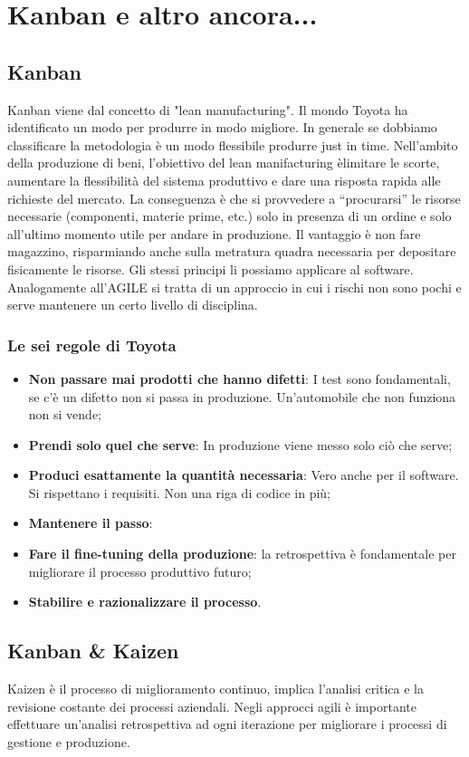 \section{Kanban e altro ancora...}
\subsection{Kanban}
Kanban viene dal concetto di "lean manufacturing". Il mondo Toyota ha identificato un modo per produrre in modo migliore. In generale se dobbiamo classificare la metodologia è un modo flessibile produrre just in time. Nell’ambito della produzione di beni, l’obiettivo del lean manifacturing èlimitare le scorte, aumentare la flessibilità del sistema produttivo e dare una risposta rapida alle richieste del mercato. La conseguenza è che si provvedere a “procurarsi” le risorse necessarie (componenti, materie prime, etc.) solo in presenza di un ordine e solo all’ultimo momento utile per andare in produzione.
Il vantaggio è non fare magazzino, risparmiando anche sulla metratura quadra necessaria per depositare fisicamente le risorse. Gli stessi principi li possiamo applicare al software.
Analogamente all'AGILE si tratta di un approccio in cui i rischi non sono pochi e serve mantenere un certo livello di disciplina.

\subsubsection{Le sei regole di Toyota}
\begin{itemize}
	\item \textbf{Non passare mai prodotti che hanno difetti}: I test sono fondamentali, se c'è un difetto non si passa in produzione. Un'automobile che non funziona non si vende;
	\item \textbf{Prendi solo quel che serve}: In produzione viene messo solo ciò che serve;
	\item \textbf{Produci esattamente la quantità necessaria}: Vero anche per il software. Si rispettano i requisiti. Non una riga di codice in più;
	\item \textbf{Mantenere il passo}:
	\item \textbf{Fare il fine-tuning della produzione}: la retrospettiva è fondamentale per migliorare il processo produttivo futuro;
	\item \textbf{Stabilire e razionalizzare il processo}.
\end{itemize}
\subsection{Kanban \& Kaizen}
Kaizen è il processo di miglioramento continuo, implica l’analisi critica e la revisione
costante dei processi aziendali. Negli approcci agili è importante effettuare un’analisi retrospettiva ad
ogni iterazione per migliorare i processi di gestione e produzione.
